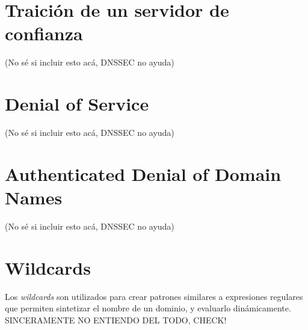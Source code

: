 \section{Traici\'on de un servidor de confianza}

(No s\'e si incluir esto ac\'a, DNSSEC no ayuda)

\section{Denial of Service}

(No s\'e si incluir esto ac\'a, DNSSEC no ayuda)

\section{Authenticated Denial of Domain Names}

(No s\'e si incluir esto ac\'a, DNSSEC no ayuda)

\section{Wildcards}

Los \textit{wildcards} son utilizados para crear patrones similares a expresiones regulares que permiten sintetizar el nombre de un dominio, y evaluarlo din\'amicamente\cite{rfc1034}. SINCERAMENTE NO ENTIENDO DEL TODO, CHECK!
